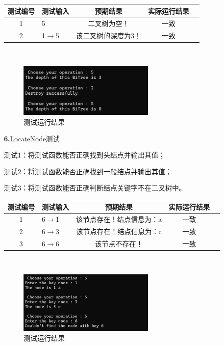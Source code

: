 \documentclass[supercite]{Experimental_Report}
\theoremstyle{definition}
\begin{document}
\begin{tabular}{|c|l|c|c|c|}
	\hline
	测试编号 & 测试输入 & 预期结果 & 实际运行结果 \\
	\hline
	1 & 5 & 二叉树为空！ & 一致 \\
	\hline
	2 & 1$\rightarrow$5 & 该二叉树的深度为3！ & 一致 \\
	\hline
\end{tabular}

~\

\begin{figure}[H]
 	\centering
 	\includegraphics[width=0.6\textwidth]{images/二叉树测试5.png}
 	\caption{测试运行结果}
 	\label{txlab}
 \end{figure}

\noindent\textbf{ 6.}LocateNode测试 

测试1：将测试函数能否正确找到头结点并输出其值；

测试2：将测试函数能否正确找到一般结点并输出其值；

测试3：将测试函数能否正确判断结点关键字不在二叉树中。

\vspace{0.5em}

\begin{tabular}{|c|l|c|c|c|}
	\hline
	测试编号 & 测试输入 & 预期结果 & 实际运行结果 \\
	\hline
	1 & 6$\rightarrow$1 & 该节点存在！结点信息为：a & 一致 \\
	\hline
	2 & 6$\rightarrow$3 & 该节点存在！结点信息为：c & 一致 \\
	\hline
	3 & 6$\rightarrow$6 & 该节点不存在！ & 一致 \\
	\hline
\end{tabular}

~\

\begin{figure}[H]
 	\centering
 	\includegraphics[width=0.6\textwidth]{images/二叉树测试6.png}
 	\caption{测试运行结果}
 	\label{txlab}
 \end{figure}
\end{document}
